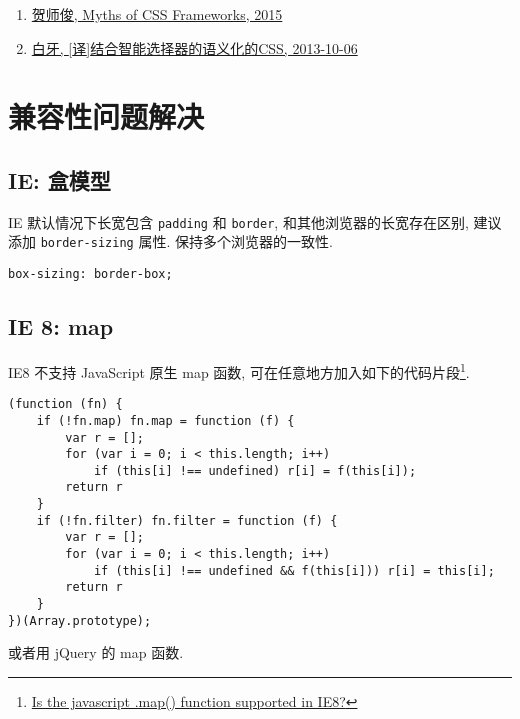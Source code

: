 \begin{enumerate}
\def\labelenumi{\arabic{enumi}.}
\tightlist
\item
  \href{http://johnhax.net/2015/myth-of-css-frameworks/}{贺师俊, Myths
  of CSS Frameworks, 2015}
\item
  \href{https://www.w3cplus.com/css/semantic-css-with-intelligent-selectors.html}{白牙,
  {[}译{]}结合智能选择器的语义化的CSS, 2013-10-06}
\end{enumerate}

\section{兼容性问题解决}\label{ux517cux5bb9ux6027ux95eeux9898ux89e3ux51b3}

\subsection{IE: 盒模型}\label{ie-ux76d2ux6a21ux578b}

IE 默认情况下长宽包含 \lstinline!padding! 和 \lstinline!border!,
和其他浏览器的长宽存在区别, 建议添加 \lstinline!border-sizing! 属性.
保持多个浏览器的一致性.

\begin{lstlisting}
box-sizing: border-box;
\end{lstlisting}

\subsection{IE 8: map}\label{ie-8-map}

IE8 不支持 JavaScript 原生 map 函数,
可在任意地方加入如下的代码片段\footnote{\href{http://stackoverflow.com/questions/7350912/is-the-javascript-map-function-supported-in-ie8}{Is
  the javascript .map() function supported in IE8?}}.

\begin{lstlisting}
(function (fn) {
    if (!fn.map) fn.map = function (f) {
        var r = [];
        for (var i = 0; i < this.length; i++)
            if (this[i] !== undefined) r[i] = f(this[i]);
        return r
    }
    if (!fn.filter) fn.filter = function (f) {
        var r = [];
        for (var i = 0; i < this.length; i++)
            if (this[i] !== undefined && f(this[i])) r[i] = this[i];
        return r
    }
})(Array.prototype);
\end{lstlisting}

或者用 jQuery 的 map 函数.

